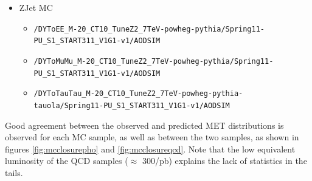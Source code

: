 \begin{itemize}
\begin{itemize}
  \end{itemize}
\item ZJet MC
  \begin{itemize}
  \item \verb=/DYToEE_M-20_CT10_TuneZ2_7TeV-powheg-pythia/Spring11-PU_S1_START311_V1G1-v1/AODSIM=
  \item \verb=/DYToMuMu_M-20_CT10_TuneZ2_7TeV-powheg-pythia/Spring11-PU_S1_START311_V1G1-v1/AODSIM=
  \item \verb=/DYToTauTau_M-20_CT10_TuneZ2_7TeV-powheg-pythia-tauola/Spring11-PU_S1_START311_V1G1-v1/AODSIM=
  \end{itemize}
\end{itemize}


Good agreement between the observed and predicted MET distributions is observed for each MC sample, 
as well as between the two samples, as shown in figures \ref{fig:mcclosurepho} and \ref{fig:mcclosureqcd}. 
Note that the low equivalent luminosity of the QCD samples ($\approx$ 300/pb) explains the lack of 
statistics in the tails.

